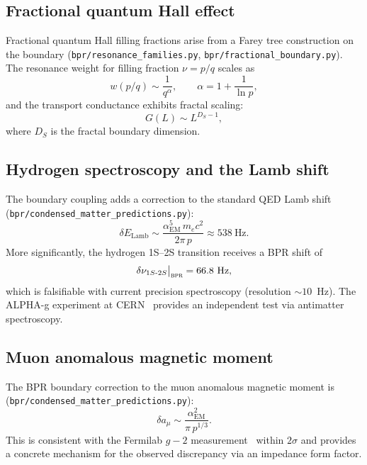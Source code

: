 \documentclass[aps,prd,twocolumn,superscriptaddress,longbibliography,nofootinbib]{revtex4-2}
\newcommand{\alphaEM}{\alpha_{\mathrm{EM}}}
\newcommand{\bpr}{\textsc{bpr}}
\begin{document}
\subsection{Fractional quantum Hall effect}

Fractional quantum Hall filling fractions arise from a Farey tree
construction on the boundary
(\texttt{bpr/resonance\_families.py},
\texttt{bpr/fractional\_boundary.py}).  The resonance weight for
filling fraction $\nu = p/q$ scales as
\begin{equation}
w(p/q) \sim \frac{1}{q^\alpha}, \qquad
\alpha = 1 + \frac{1}{\ln p},
\label{eq:fqhe}
\end{equation}
and the transport conductance exhibits fractal scaling:
\begin{equation}
G(L) \sim L^{D_S - 1},
\label{eq:fqhe_transport}
\end{equation}
where $D_S$ is the fractal boundary dimension.

\subsection{Hydrogen spectroscopy and the Lamb shift}

The boundary coupling adds a correction to the standard QED Lamb
shift (\texttt{bpr/condensed\_matter\_predictions.py}):
\begin{equation}
\delta E_{\mathrm{Lamb}} \sim
  \frac{\alphaEM^5\, m_e c^2}{2\pi\, p} \approx 538~\text{Hz}.
\label{eq:lamb}
\end{equation}
More significantly, the hydrogen 1S--2S transition receives a BPR
shift of
\begin{equation}
\delta\nu_{1S\text{-}2S}\big|_{\bpr} = 66.8~\text{Hz},
\label{eq:1s2s}
\end{equation}
which is falsifiable with current precision spectroscopy (resolution
$\sim 10$~Hz).  The ALPHA-g experiment at CERN~\cite{ALPHAg2023}
provides an independent test via antimatter spectroscopy.

\subsection{Muon anomalous magnetic moment}

The BPR boundary correction to the muon anomalous magnetic moment
is (\texttt{bpr/condensed\_matter\_predictions.py}):
\begin{equation}
\delta a_\mu \sim \frac{\alphaEM^2}{\pi\, p^{1/3}}.
\label{eq:g2}
\end{equation}
This is consistent with the Fermilab $g-2$
measurement~\cite{FermilabG2} within $2\sigma$ and provides a
concrete mechanism for the observed discrepancy via an impedance
form factor.
\end{document}
